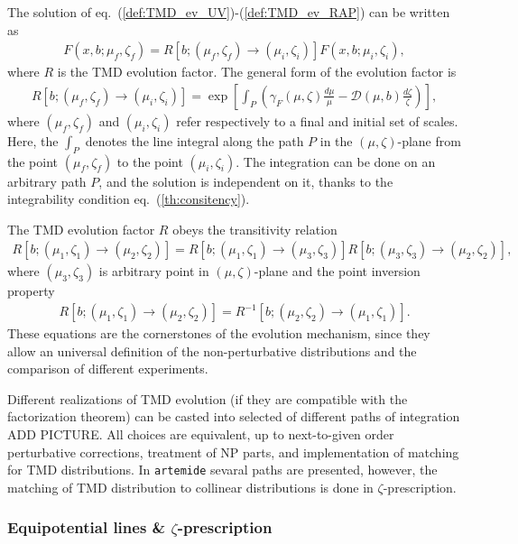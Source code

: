 \documentclass[prd,nofootinbib,eqsecnum,final]{revtex4}
\renewcommand{\(}{\left(}
\renewcommand{\)}{\right)}
\renewcommand{\[}{\left[}
\renewcommand{\]}{\right]}
\newcommand{\red}[1]{{\color[rgb]{1,0,0} #1}}
\begin{document}
The solution of eq.~(\ref{def:TMD_ev_UV})-(\ref{def:TMD_ev_RAP})  can be written as
\begin{eqnarray}\label{th:TMD_evol}
F(x,b;\mu_f,\zeta_f)=R[b;(\mu_f,\zeta_f)\to (\mu_i,\zeta_i)]F(x,b;\mu_i,\zeta_i),
\end{eqnarray}
where $R$ is the TMD evolution factor. The general form of the evolution factor is
\begin{eqnarray}\label{th:TMD_R}
R[b;(\mu_f,\zeta_f)\to (\mu_i,\zeta_i)]=\exp\[\int_P \(\gamma_F(\mu,\zeta)\frac{d\mu}{\mu} -\mathcal{D}(\mu,b)\frac{d\zeta}{\zeta}\)\] ,
\end{eqnarray}
where $(\mu_f,\zeta_f)$ and $(\mu_i,\zeta_i)$ refer respectively to a final  and initial set of scales. Here, the $\int_P$ denotes the line integral along the path $P$ in the $(\mu,\zeta)$-plane from the point $(\mu_f,\zeta_f)$ to the point $(\mu_i,\zeta_i)$. The integration can be done on an arbitrary path $P$, and the solution is independent on it, thanks to the integrability condition eq.~(\ref{th:consitency}). 

The TMD evolution factor $R$ obeys the transitivity relation
\begin{eqnarray}\label{th:transitivity}
R[b;(\mu_1,\zeta_1)\to (\mu_2,\zeta_2)]=R[b;(\mu_1,\zeta_1)\to (\mu_3,\zeta_3)]R[b;(\mu_3,\zeta_3)\to (\mu_2,\zeta_2)],
\end{eqnarray}
where $(\mu_3,\zeta_3)$ is arbitrary point in $(\mu,\zeta)$-plane and the  point inversion property
\begin{eqnarray}\label{th:inversion}
R[b;(\mu_1,\zeta_1)\to (\mu_2,\zeta_2)]=R^{-1}[b;(\mu_2,\zeta_2)\to (\mu_1,\zeta_1)].
\end{eqnarray}
These equations are the cornerstones of the evolution mechanism, since they allow an universal definition of the non-perturbative distributions and the comparison of different experiments. 

Different realizations of TMD evolution (if they are compatible with the factorization theorem) can be casted into selected of different paths of integration \red{ADD PICTURE}. All choices are equivalent, up to next-to-given order perturbative corrections, treatment of NP parts, and implementation of matching for TMD distributions. In \texttt{artemide} sevaral paths are presented, however, the matching of TMD distribution to collinear distributions is done in $\zeta$-prescription.

\subsubsection{Equipotential lines \& $\zeta$-prescription}
\end{document}
